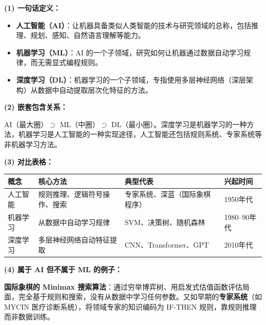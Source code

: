 \documentclass[a4paper,11pt]{ctexart}
\begin{document}
\begin{solutionbox}[参考答案与详细解析]
    \textbf{(1) 一句话定义：}
    \begin{itemize}
        \item \textbf{人工智能（AI）}：让机器具备类似人类智能的技术与研究领域的总称，包括推理、规划、感知、自然语言理解等能力。
        \item \textbf{机器学习（ML）}：AI 的一个子领域，研究如何让机器通过数据自动学习规律，而无需显式编程规则。
        \item \textbf{深度学习（DL）}：机器学习的一个子领域，专指使用多层神经网络（深层架构）从数据中自动提取层次化特征的方法。
    \end{itemize}

    \textbf{(2) 嵌套包含关系：}

    AI（最大圈）$\supset$ ML（中圈）$\supset$ DL（最小圈）。深度学习是机器学习的一种方法，机器学习是人工智能的一种实现途径，人工智能还包括规则系统、专家系统等非机器学习方法。

    \textbf{(3) 对比表格：}
    \begin{center}
    \begin{tabular}{p{2.8cm} p{3.8cm} p{3.8cm} p{2.8cm}}
        \toprule
        概念 & 核心方法 & 典型代表 & 兴起时间 \\
        \midrule
        人工智能 & 规则推理、逻辑符号操作、搜索 & 专家系统、深蓝（国际象棋程序） & 1950年代 \\[0.8em]
        机器学习 & 从数据中自动学习规律 & SVM、决策树、随机森林 & 1980--90年代 \\[0.8em]
        深度学习 & 多层神经网络自动特征提取 & CNN、Transformer、GPT & 2010年代 \\
        \bottomrule
    \end{tabular}
    \end{center}

    \textbf{(4) 属于 AI 但不属于 ML 的例子：}

    \textbf{国际象棋的 Minimax 搜索算法}：通过穷举博弈树、用启发式估值函数评估局面，完全基于规则和搜索，没有从数据中学习任何参数。又如早期的\textbf{专家系统}（如 MYCIN 医疗诊断系统），将领域专家的知识编码为 IF-THEN 规则，靠规则推理而非数据训练。
\end{solutionbox}
\end{document}

